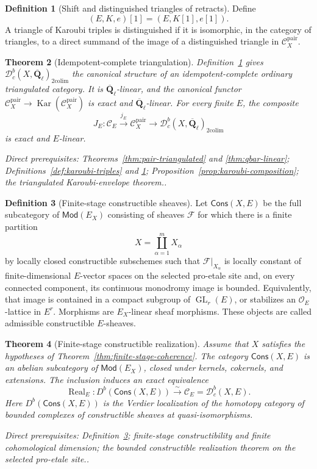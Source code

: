 \documentclass[10pt]{article}
\newtheorem{theorem}{Theorem}[section]
\theoremstyle{definition}
\newtheorem{definition}[theorem]{Definition}
\newcommand{\Qlb}{\overline{\mathbf Q}_\ell}
\newcommand{\Dbc}{\mathcal D^b_c}
\newcommand{\Kar}{\operatorname{Kar}}
\newcommand{\Cons}{\mathsf{Cons}}
\newcommand{\Pair}{\mathcal C_X^{\mathrm{pair}}}
\newcommand{\depends}[1]{\par\smallskip\noindent\textit{Direct prerequisites:} #1.}
\begin{document}
\begin{definition}[Shift and distinguished triangles of retracts]
\label{def:karoubi-triangles}
Define
\[
 (E,K,e)[1]=(E,K[1],e[1]).
\]
A triangle of Karoubi triples is distinguished if it is isomorphic, in the
category of triangles, to a direct summand of the image of a distinguished
triangle in $\Pair$.
\end{definition}

\begin{theorem}[Idempotent-complete triangulation]
\label{thm:karoubi-triangulated}
Definition~\ref{def:karoubi-triangles} gives
$\Dbc(X,\Qlb)_{\mathrm{2colim}}$ the canonical structure of an
idempotent-complete ordinary triangulated category.  It is $\Qlb$-linear,
and the canonical functor $\Pair\to\Kar(\Pair)$ is exact and
$\Qlb$-linear.  For every finite $E$, the composite
\[
 J_E:\mathcal C_E\xrightarrow{j_E}\Pair
       \longrightarrow\Dbc(X,\Qlb)_{\mathrm{2colim}}
\]
is exact and $E$-linear.
\depends{Theorems~\ref{thm:pair-triangulated} and
\ref{thm:qbar-linear}; Definitions~\ref{def:karoubi-triples} and
\ref{def:karoubi-triangles}; Proposition~\ref{prop:karoubi-composition};
the triangulated Karoubi-envelope theorem.}
\end{theorem}

\begin{definition}[Finite-stage constructible sheaves]
\label{def:finite-constructible-sheaves}
Let $\Cons(X,E)$ be the full subcategory of $\mathsf{Mod}(E_X)$ consisting
of sheaves $\mathcal F$ for which there is a finite partition
\[
 X=\coprod_{\alpha=1}^m X_\alpha
\]
by locally closed constructible subschemes such that
$\mathcal F|_{X_\alpha}$ is locally constant of finite-dimensional
$E$-vector spaces on the selected pro-etale site and, on every connected
component, its continuous monodromy image is bounded.  Equivalently, that
image is contained in a compact subgroup of $\operatorname{GL}_r(E)$, or
stabilizes an $\mathcal O_E$-lattice in $E^r$.  Morphisms are $E_X$-linear
sheaf morphisms.  These objects are called admissible constructible
$E$-sheaves.
\end{definition}

\begin{theorem}[Finite-stage constructible realization]
\label{thm:constructible-realization}
Assume that $X$ satisfies the hypotheses of
Theorem~\ref{thm:finite-stage-coherence}.  The category $\Cons(X,E)$ is an
abelian subcategory of $\mathsf{Mod}(E_X)$, closed under kernels,
cokernels, and extensions.  The inclusion induces an exact equivalence
\[
 \operatorname{Real}_E:D^b(\Cons(X,E))
 \xrightarrow{\sim}\mathcal C_E=\Dbc(X,E).
\]
Here $D^b(\Cons(X,E))$ is the Verdier localization of the homotopy category
of bounded complexes of constructible sheaves at quasi-isomorphisms.
\depends{Definition~\ref{def:finite-constructible-sheaves}; finite-stage
constructibility and finite cohomological dimension; the bounded
constructible realization theorem on the selected pro-etale site.}
\end{theorem}
\end{document}

